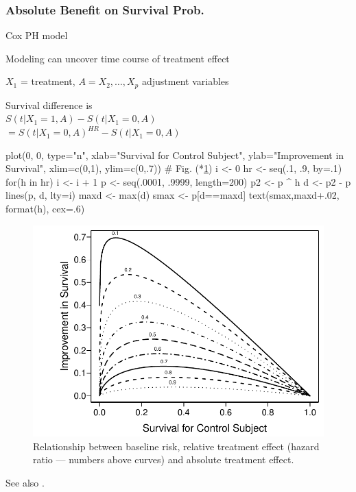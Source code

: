 \subsubsection{Absolute Benefit on Survival Prob.}
\bi
\item   Cox PH model
\item   Modeling can uncover time course of treatment effect
\item   $X_1$ = treatment, $A={X_{2},\ldots,X_{p}}$ adjustment variables
\item   Survival difference is \\ $S(t | X_{1}=1, A) - S(t | X_{1}=0, A)$
\\ $ = S(t | X_{1}=0, A)^{HR} - S(t | X_{1}=0, A)$
\begin{Schunk}
\begin{Sinput}
plot(0, 0, type="n", xlab="Survival for Control Subject",
     ylab="Improvement in Survival",
     xlim=c(0,1), ylim=c(0,.7))     # Fig. (*\ref{fig:ancova-hr-vs-surv}\ipacue*)
i <- 0
hr <- seq(.1, .9, by=.1)
for(h in hr) {
  i <- i + 1
  p <- seq(.0001, .9999, length=200)
  p2 <- p ^ h
  d <- p2 - p
  lines(p, d, lty=i)
  maxd <- max(d)
  smax <- p[d==maxd]
  text(smax,maxd+.02, format(h), cex=.6)
}
\end{Sinput}
\begin{figure}[htbp]

\centerline{\includegraphics[width=\maxwidth]{ancova-hr-vs-surv-1} }

\caption[Baseline risk, hazard ratio, and absolute effect]{Relationship between baseline risk, relative treatment effect (hazard ratio --- numbers above curves) and absolute treatment effect.}\label{fig:ancova-hr-vs-surv}
\end{figure}
\end{Schunk}
\item See also \cite{ken07lim}.
\ei

